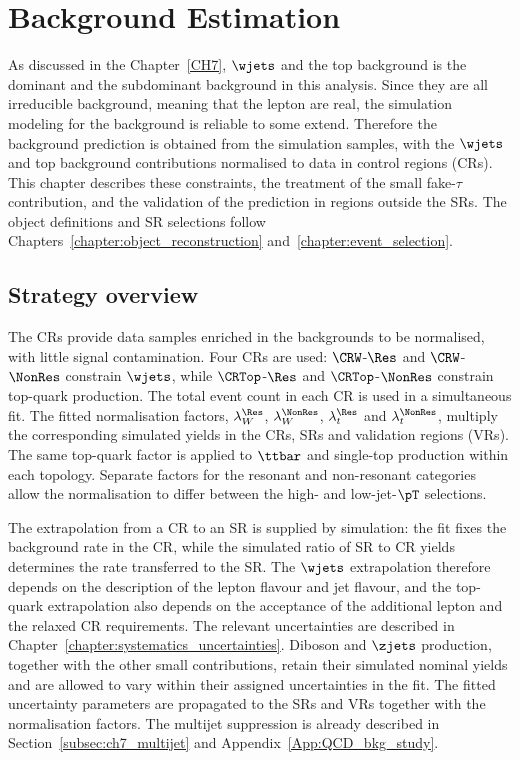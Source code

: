 \chapter{Background Estimation}
\label{chapter:background_estimation}

As discussed in the Chapter~\ref{CH7}, $\wjets$ and the top background is the dominant and the subdominant background in this analysis. Since they are all irreducible background, meaning that the \tau lepton are real, the simulation modeling for the background is reliable to some extend. Therefore the background prediction is obtained from the simulation samples, with the $\wjets$ and top background contributions normalised to data in control regions (CRs).
This chapter describes these constraints, the treatment of the small fake-$\tau$ contribution, and the validation of the prediction in regions outside the SRs.
The object definitions and SR selections follow Chapters~\ref{chapter:object_reconstruction} and~\ref{chapter:event_selection}.

\section{Strategy overview}
\label{sec:ch8_strategy}

The CRs provide data samples enriched in the backgrounds to be normalised, with little signal contamination.
Four CRs are used: $\CRW$-$\Res$ and $\CRW$-$\NonRes$ constrain $\wjets$, while $\CRTop$-$\Res$ and $\CRTop$-$\NonRes$ constrain top-quark production.
The total event count in each CR is used in a simultaneous fit.
The fitted normalisation factors, $\lambda_W^{\Res}$, $\lambda_W^{\NonRes}$, $\lambda_t^{\Res}$ and $\lambda_t^{\NonRes}$, multiply the corresponding simulated yields in the CRs, SRs and validation regions (VRs).
The same top-quark factor is applied to $\ttbar$ and single-top production within each topology.
Separate factors for the resonant and non-resonant categories allow the normalisation to differ between the high- and low-jet-$\pT$ selections.

The extrapolation from a CR to an SR is supplied by simulation: the fit fixes the background rate in the CR, while the simulated ratio of SR to CR yields determines the rate transferred to the SR.
The $\wjets$ extrapolation therefore depends on the description of the lepton flavour and jet flavour, and the top-quark extrapolation also depends on the acceptance of the additional lepton and the relaxed CR requirements.
The relevant uncertainties are described in Chapter~\ref{chapter:systematics_uncertainties}.
Diboson and $\zjets$ production, together with the other small contributions, retain their simulated nominal yields and are allowed to vary within their assigned uncertainties in the fit.
The fitted uncertainty parameters are propagated to the SRs and VRs together with the normalisation factors.
The multijet suppression is already described in Section~\ref{subsec:ch7_multijet} and Appendix~\ref{App:QCD_bkg_study}.

